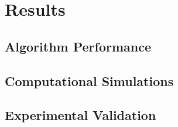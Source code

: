 \chapter{Results}











\lipsum[1-2]

\section{Algorithm Performance}


\lipsum[1-3]

\section{Computational Simulations}



\lipsum[1-6]

\section{Experimental Validation}


\lipsum[1-6]


%
%
%
%
%
%
%

